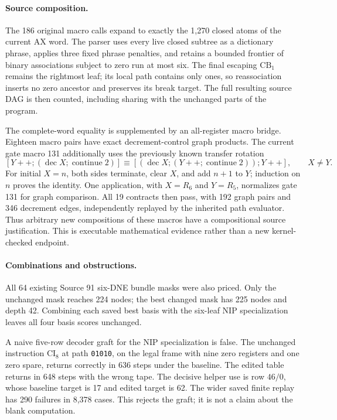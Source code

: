 \paragraph{Source composition.}
The 186 original macro calls expand to exactly the 1,270 closed atoms of the
current AX word.  The parser uses every live closed subtree as a dictionary
phrase, applies three fixed phrase penalties, and retains a bounded frontier
of binary associations subject to zero run at most six.  The final escaping
$\mathrm{CB}_1$ remains the rightmost leaf; its local path contains only ones,
so reassociation inserts no zero ancestor and preserves its break target.
The full resulting source DAG is then counted, including sharing with the
unchanged parts of the program.

The complete-word equality is supplemented by an all-register macro bridge.
Eighteen macro pairs have exact decrement-control graph products.  The current
gate macro 131 additionally uses the previously known transfer rotation
\[
 [Y{+}{+};(\operatorname{dec}X;\operatorname{continue}2)]
 \equiv
 [(\operatorname{dec}X;(Y{+}{+};\operatorname{continue}2));Y{+}{+}],
 \qquad X\ne Y.
\]
For initial $X=n$, both sides terminate, clear $X$, and add $n+1$ to $Y$;
induction on $n$ proves the identity.  One application, with $X=R_6$ and
$Y=R_5$, normalizes gate 131 for graph comparison.  All 19 contracts then pass,
with 192 graph pairs and 346 decrement edges, independently replayed by the
inherited path evaluator.  Thus arbitrary new compositions of these macros
have a compositional source justification.  This is executable mathematical
evidence rather than a new kernel-checked endpoint.

\paragraph{Combinations and obstructions.}
All 64 existing Source 91 six-DNE bundle masks were also priced.  Only the
unchanged mask reaches 224 nodes; the best changed mask has 225 nodes and depth
42.  Combining each saved best basis with the six-leaf NIP specialization
leaves all four basis scores unchanged.

A naive five-row decoder graft for the NIP specialization is false.  The
unchanged instruction $\mathrm{CI}_8$ at path \texttt{01010}, on the legal frame
with nine zero registers and one zero spare, returns correctly in 636 steps
under the baseline.  The edited table returns in 648 steps with the wrong tape.
The decisive helper use is row $46/0$, whose baseline target is 17 and edited
target is 62.  The wider saved finite replay has 290 failures in 8,378 cases.
This rejects the graft; it is not a claim about the blank computation.

